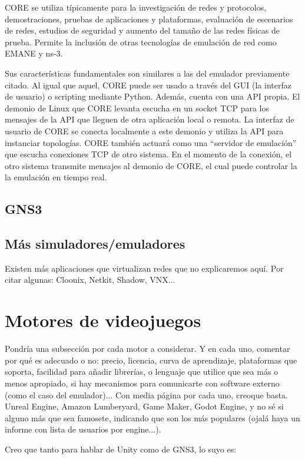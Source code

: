 CORE se utiliza típicamente para la investigación de redes y protocolos, demostraciones, pruebas de aplicaciones y plataformas, evaluación de escenarios de redes, estudios de seguridad y aumento del tamaño de las redes físicas de prueba. Permite la inclusión de otras tecnologías de emulación de red como EMANE y ns-3\cite{core}.

Sus características fundamentales son similares a las del emulador previamente citado. Al igual que aquel, CORE puede ser usado a través del GUI (la interfaz de usuario) o scripting mediante Python. Además, cuenta con una API propia. El demonio de Linux que CORE levanta escucha en un socket TCP para los mensajes de la API que lleguen de otra aplicación local o remota. La interfaz de usuario de CORE se conecta localmente a este demonio y utiliza la API para instanciar topologías. CORE también actuará como una ``servidor de emulación'' que escucha conexiones TCP de otro sistema. En el momento de la conexión, el otro sistema transmite mensajes al demonio de CORE, el cual puede controlar la la emulación en tiempo real\cite{coreapi}.

\subsection{GNS3}

\subsection{Más simuladores/emuladores}
Existen más aplicaciones que virtualizan redes que no explicaremos aquí. Por citar algunas: Cloonix, Netkit, Shadow, VNX...


\section{Motores de videojuegos}
Pondría una subsección por cada motor a considerar. Y en cada uno, comentar por qué es adecuado o no: precio, licencia, curva de aprendizaje, plataformas que soporta, facilidad para añadir librerías, o lenguaje que utilice que sea más o menos apropiado, si hay mecanismos para comunicarte con software externo (como el caso del emulador)... Con media página por cada uno, creoque basta. Unreal Engine, Amazon Lumberyard, Game Maker, Godot Engine, y no sé si alguno más que sea famosete, indicando que son los más populares (ojalá haya un informe con lista de usuarios por engine...).

Creo que tanto para hablar de Unity como de GNS3, lo suyo es:

